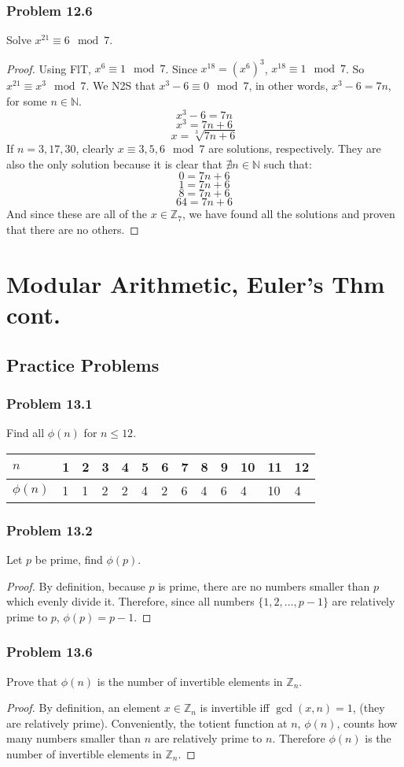 \documentclass[hidelinks,12pt]{article}
\newcommand{\N}{\mathbb{N}}
\newcommand{\Z}{\mathbb{Z}}
\begin{document}
\subsubsection{Problem 12.6}
Solve $x^{21}\equiv6\mod{7}$.
\begin{proof} Using FlT, $x^{6}\equiv1\mod{7}$. Since $x^{18}=(x^{6})^3$, $x^{18}\equiv1\mod{7}$. So $x^{21}\equiv x^3\mod{7}$. \newline We N2S that $x^3-6\equiv0\mod{7}$, in other words, $x^3-6=7n$, for some $n\in\N$. $$x^3-6=7n$$ $$x^3=7n+6$$ $$x=\sqrt[3]{7n+6}$$ If $n=3,17,30$, clearly $x\equiv3,5,6\mod{7}$ are solutions, respectively. They are also the only solution because it is clear that $\nexists n\in\N$ such that: 
$$0=7n+6$$ $$1=7n+6$$ $$8=7n+6$$ $$64=7n+6$$
And since these are all of the $x\in\Z_{7}$, we have found all the solutions and proven that there are no others.\end{proof}
\newpage
\section{Modular Arithmetic, Euler's Thm cont.}
\subsection{Practice Problems}
\subsubsection{Problem 13.1}
Find all $\phi(n)$ for $n\leq12$.
\begin{table}[h]
\begin{tabular}{|l|l|l|l|l|l|l|l|l|l|l|l|l|}
\hline
$n$       & 1 & 2 & 3 & 4 & 5 & 6 & 7 & 8 & 9 & 10 & 11 & 12 \\ \hline
$\phi(n)$ & 1 & 1 & 2 & 2 & 4 & 2 & 6 & 4 & 6 & 4  & 10 & 4  \\ \hline
\end{tabular}
\end{table}
\subsubsection{Problem 13.2}
Let $p$ be prime, find $\phi(p)$.
\begin{proof}
By definition, because $p$ is prime, there are no numbers smaller than $p$ which evenly divide it. Therefore, since all numbers $\{1,2,\dots,p-1\}$ are relatively prime to $p$, $\phi(p)=p-1$.
\end{proof}
\subsubsection{Problem 13.6}
Prove that $\phi(n)$ is the number of invertible elements in $\Z_{n}$.
\begin{proof}
By definition, an element $x\in\Z_n$ is invertible iff $\gcd(x,n)=1$, (they are relatively prime). Conveniently, the totient function at $n$, $\phi(n)$, counts how many numbers smaller than $n$ are relatively prime to $n$. Therefore $\phi(n)$ is the number of invertible elements in $\Z_n$.
\end{proof}
\newpage
\end{document}
